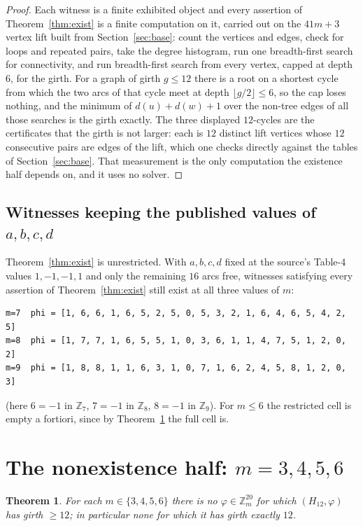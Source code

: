 \documentclass[11pt]{amsart}
\newtheorem{theorem}{Theorem}
\theoremstyle{remark}
\begin{document}
\begin{proof}
Each witness is a finite exhibited object and every assertion of Theorem~\ref{thm:exist} is a
finite computation on it, carried out on the $41m+3$ vertex lift built from
Section~\ref{sec:base}: count the vertices and edges, check for loops and repeated pairs, take
the degree histogram, run one breadth-first search for connectivity, and run breadth-first
search from every vertex, capped at depth~$6$, for the girth. For a graph of girth $g\le 12$
there is a root on a shortest cycle from which the two arcs of that cycle meet at depth
$\lfloor g/2\rfloor\le 6$, so the cap loses nothing, and the minimum of
$d(u)+d(w)+1$ over the non-tree edges of all those searches is the girth exactly. The three
displayed $12$-cycles are the certificates that the girth is not larger: each is $12$ distinct
lift vertices whose $12$ consecutive pairs are edges of the lift, which one checks directly
against the tables of Section~\ref{sec:base}. That measurement is the only computation the
existence half depends on, and it uses no solver.
\end{proof}

\subsection*{Witnesses keeping the published values of $a,b,c,d$}
Theorem~\ref{thm:exist} is unrestricted. With $a,b,c,d$ fixed at the source's Table-4 values
$1,-1,-1,1$ and only the remaining $16$ arcs free, witnesses satisfying every assertion of
Theorem~\ref{thm:exist} still exist at all three values of $m$:
{\footnotesize
\begin{verbatim}
m=7  phi = [1, 6, 6, 1, 6, 5, 2, 5, 0, 5, 3, 2, 1, 6, 4, 6, 5, 4, 2, 5]
m=8  phi = [1, 7, 7, 1, 6, 5, 5, 1, 0, 3, 6, 1, 1, 4, 7, 5, 1, 2, 0, 2]
m=9  phi = [1, 8, 8, 1, 1, 6, 3, 1, 0, 7, 1, 6, 2, 4, 5, 8, 1, 2, 0, 3]
\end{verbatim}}
\noindent (here $6=-1$ in $\mathbb{Z}_7$, $7=-1$ in $\mathbb{Z}_8$, $8=-1$ in $\mathbb{Z}_9$).
For $m\le 6$ the restricted cell is empty a fortiori, since by
Theorem~\ref{thm:none} the full cell is.

\section{The nonexistence half: $m=3,4,5,6$}\label{sec:none}

\begin{theorem}\label{thm:none}
For each $m\in\{3,4,5,6\}$ there is \emph{no} $\varphi\in\mathbb{Z}_m^{20}$ for which
$(H_{12},\varphi)$ has girth $\ge 12$; in particular none for which it has girth exactly $12$.
\end{theorem}
\end{document}
